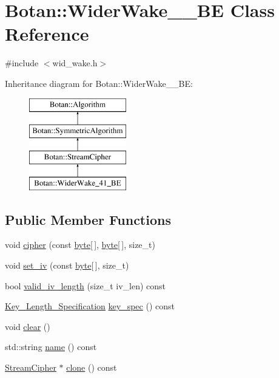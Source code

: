 \hypertarget{classBotan_1_1WiderWake__41__BE}{\section{Botan\-:\-:Wider\-Wake\-\_\-\_\-\-B\-E Class Reference}
\label{classBotan_1_1WiderWake__41__BE}
}


{\ttfamily \#include $<$wid\-\_\-wake.\-h$>$}

Inheritance diagram for Botan\-:\-:Wider\-Wake\-\_\-\_\-\-B\-E\-:\begin{figure}[H]
\begin{center}
\leavevmode
\includegraphics[height=4.000000cm]{classBotan_1_1WiderWake__41__BE}
\end{center}
\end{figure}
\subsection*{Public Member Functions}
\begin{DoxyCompactItemize}
\item 
void \hyperlink{classBotan_1_1WiderWake__41__BE_a20f142d68480c29bb8f353bb60cf501f}{cipher} (const \hyperlink{namespaceBotan_a7d793989d801281df48c6b19616b8b84}{byte}\mbox{[}$\,$\mbox{]}, \hyperlink{namespaceBotan_a7d793989d801281df48c6b19616b8b84}{byte}\mbox{[}$\,$\mbox{]}, size\-\_\-t)
\item 
void \hyperlink{classBotan_1_1WiderWake__41__BE_a60438333be4334c3c1316517ee2c699c}{set\-\_\-iv} (const \hyperlink{namespaceBotan_a7d793989d801281df48c6b19616b8b84}{byte}\mbox{[}$\,$\mbox{]}, size\-\_\-t)
\item 
bool \hyperlink{classBotan_1_1WiderWake__41__BE_ac88514fcc75e8ebf25841eb5a89c8aed}{valid\-\_\-iv\-\_\-length} (size\-\_\-t iv\-\_\-len) const 
\item 
\hyperlink{classBotan_1_1Key__Length__Specification}{Key\-\_\-\-Length\-\_\-\-Specification} \hyperlink{classBotan_1_1WiderWake__41__BE_a9b788edd7d5d677873cc28c7bb85622a}{key\-\_\-spec} () const 
\item 
void \hyperlink{classBotan_1_1WiderWake__41__BE_aff26c82116a63aea8dc976368297fb45}{clear} ()
\item 
std\-::string \hyperlink{classBotan_1_1WiderWake__41__BE_ab59d40e23e9ce9d272c7b499d1685834}{name} () const 
\item 
\hyperlink{classBotan_1_1StreamCipher}{Stream\-Cipher} $\ast$ \hyperlink{classBotan_1_1WiderWake__41__BE_a14ed5259b30c6ce7728c7f3801efe467}{clone} () const 
\end{DoxyCompactItemize}


